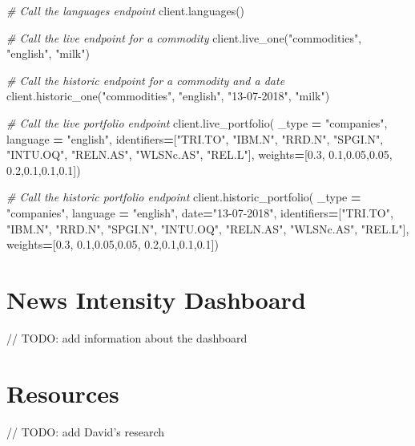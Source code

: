 \documentclass[]{book}
\newenvironment{Shaded}{\begin{snugshade}}{\end{snugshade}}
\newcommand{\FloatTok}[1]{\textcolor[rgb]{0.00,0.00,0.81}{#1}}
\newcommand{\StringTok}[1]{\textcolor[rgb]{0.31,0.60,0.02}{#1}}
\newcommand{\CommentTok}[1]{\textcolor[rgb]{0.56,0.35,0.01}{\textit{#1}}}
\newcommand{\OperatorTok}[1]{\textcolor[rgb]{0.81,0.36,0.00}{\textbf{#1}}}
\newcommand{\NormalTok}[1]{#1}
\theoremstyle{definition}
\theoremstyle{definition}
\theoremstyle{definition}
\theoremstyle{remark}
\begin{document}
\begin{Shaded}
\begin{Highlighting}[]
\CommentTok{# Call the languages endpoint}
\NormalTok{client.languages()}

\CommentTok{# Call the live endpoint for a commodity}
\NormalTok{client.live_one(}\StringTok{"commodities"}\NormalTok{, }\StringTok{"english"}\NormalTok{, }\StringTok{"milk"}\NormalTok{)}

\CommentTok{# Call the historic endpoint for a commodity and a date}
\NormalTok{client.historic_one(}\StringTok{"commodities"}\NormalTok{, }\StringTok{"english"}\NormalTok{, }\StringTok{"13-07-2018"}\NormalTok{, }\StringTok{"milk"}\NormalTok{)}

\CommentTok{# Call the live portfolio endpoint}
\NormalTok{client.live_portfolio( _type }\OperatorTok{=} \StringTok{"companies"}\NormalTok{, language }\OperatorTok{=} \StringTok{"english"}\NormalTok{, }
\NormalTok{                      identifiers}\OperatorTok{=}\NormalTok{[}\StringTok{"TRI.TO"}\NormalTok{, }\StringTok{"IBM.N"}\NormalTok{, }\StringTok{"RRD.N"}\NormalTok{, }\StringTok{"SPGI.N"}\NormalTok{, }\StringTok{"INTU.OQ"}\NormalTok{, }\StringTok{"RELN.AS"}\NormalTok{, }\StringTok{"WLSNc.AS"}\NormalTok{, }\StringTok{"REL.L"}\NormalTok{], }
\NormalTok{                      weights}\OperatorTok{=}\NormalTok{[}\FloatTok{0.3}\NormalTok{, }\FloatTok{0.1}\NormalTok{,}\FloatTok{0.05}\NormalTok{,}\FloatTok{0.05}\NormalTok{, }\FloatTok{0.2}\NormalTok{,}\FloatTok{0.1}\NormalTok{,}\FloatTok{0.1}\NormalTok{,}\FloatTok{0.1}\NormalTok{])}

\CommentTok{# Call the historic portfolio endpoint                    }
\NormalTok{client.historic_portfolio( _type }\OperatorTok{=} \StringTok{"companies"}\NormalTok{, language }\OperatorTok{=} \StringTok{"english"}\NormalTok{, date}\OperatorTok{=}\StringTok{"13-07-2018"}\NormalTok{, }
\NormalTok{                          identifiers}\OperatorTok{=}\NormalTok{[}\StringTok{"TRI.TO"}\NormalTok{, }\StringTok{"IBM.N"}\NormalTok{, }\StringTok{"RRD.N"}\NormalTok{, }\StringTok{"SPGI.N"}\NormalTok{, }\StringTok{"INTU.OQ"}\NormalTok{, }\StringTok{"RELN.AS"}\NormalTok{, }\StringTok{"WLSNc.AS"}\NormalTok{, }\StringTok{"REL.L"}\NormalTok{], }
\NormalTok{                          weights}\OperatorTok{=}\NormalTok{[}\FloatTok{0.3}\NormalTok{, }\FloatTok{0.1}\NormalTok{,}\FloatTok{0.05}\NormalTok{,}\FloatTok{0.05}\NormalTok{, }\FloatTok{0.2}\NormalTok{,}\FloatTok{0.1}\NormalTok{,}\FloatTok{0.1}\NormalTok{,}\FloatTok{0.1}\NormalTok{])}
\end{Highlighting}
\end{Shaded}

\chapter{News Intensity Dashboard}\label{thedashboard}

// TODO: add information about the dashboard

\chapter{Resources}\label{resources}

// TODO: add David's research


\end{document}
